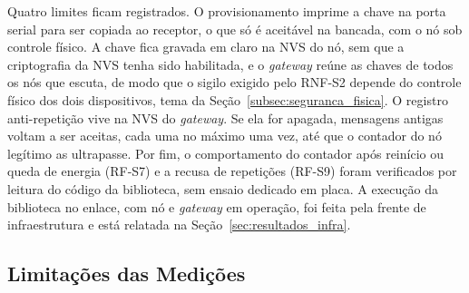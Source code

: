 Quatro limites ficam registrados. O provisionamento imprime a chave na porta serial para ser copiada ao receptor, o que só é aceitável na bancada, com o nó sob controle físico. A chave fica gravada em claro na NVS do nó, sem que a criptografia da NVS tenha sido habilitada, e o \textit{gateway} reúne as chaves de todos os nós que escuta, de modo que o sigilo exigido pelo RNF-S2 depende do controle físico dos dois dispositivos, tema da Seção~\ref{subsec:seguranca_fisica}. O registro anti-repetição vive na NVS do \textit{gateway}. Se ela for apagada, mensagens antigas voltam a ser aceitas, cada uma no máximo uma vez, até que o contador do nó legítimo as ultrapasse. Por fim, o comportamento do contador após reinício ou queda de energia (RF-S7) e a recusa de repetições (RF-S9) foram verificados por leitura do código da biblioteca, sem ensaio dedicado em placa. A execução da biblioteca no enlace, com nó e \textit{gateway} em operação, foi feita pela frente de infraestrutura e está relatada na Seção~\ref{sec:resultados_infra}.


\subsection{Limitações das Medições}
\label{subsec:limitacoes_ascon}

